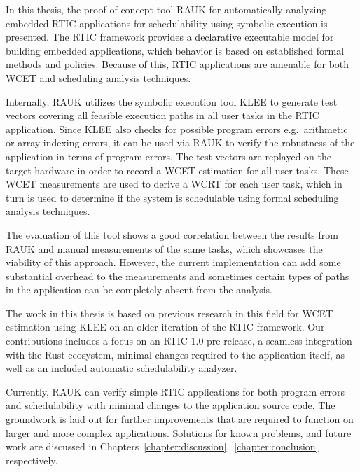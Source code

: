 In this thesis, the proof-of-concept tool RAUK for automatically analyzing
embedded RTIC applications for schedulability using symbolic execution is presented.
The RTIC framework provides a declarative executable model for building
embedded applications, which behavior is based on established formal methods
and policies. Because of this, RTIC applications are amenable for both WCET and
scheduling analysis techniques.

Internally, RAUK utilizes the symbolic execution tool KLEE to generate test vectors
covering all feasible execution paths in all user tasks in the RTIC
application. Since KLEE also checks for possible program errors e.g.\ arithmetic or
array indexing errors, it can be used via RAUK to verify the robustness of the
application in terms of program errors. The test vectors are replayed on the
target hardware in order to record a WCET estimation for all user
tasks. These WCET measurements are used to derive a WCRT for each user task, which
in turn is used to determine if the system is schedulable using formal scheduling
analysis techniques.

The evaluation of this tool shows a good correlation between the results from
RAUK and manual measurements of the same tasks, which showcases the viability
of this approach. However, the current implementation can add some substantial
overhead to the measurements and sometimes certain types of paths in the
application can be completely absent from the analysis.

The work in this thesis is based on previous research in this field for WCET
estimation using KLEE on an older iteration of the RTIC framework. Our
contributions includes a focus on an RTIC 1.0 pre-release, a seamless
integration with the Rust ecosystem, minimal changes required to the
application itself, as well as an included automatic schedulability analyzer.

Currently, RAUK can verify simple RTIC applications for both program errors and
schedulability with minimal changes to the application source code. The
groundwork is laid out for further improvements that are required to function
on larger and more complex applications. Solutions for known problems, and future work
are discussed in Chapters~\ref{chapter:discussion},~\ref{chapter:conclusion} respectively.
